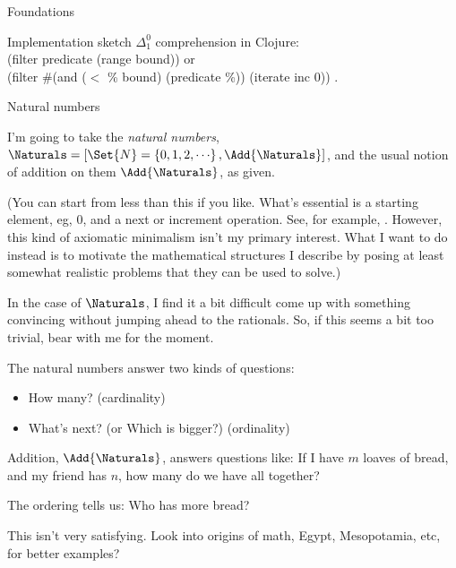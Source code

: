 \documentclass[12pt]{PalisadesLakesBook}
\begin{document}
\begin{plSection}{Foundations}
\begin{plSection}{\texorpdfstring{}{RCA0}}
\begin{plSection}{Implementation sketch}
  $\Delta^0_1$ comprehension in Clojure:\\
    {\clojureFont (filter predicate (range bound))} or\\
      {\clojureFont (filter \#(and ($<$ \% bound) (predicate \%)) (iterate inc 0))}  .

  \end{plSection}%

  \end{plSection}%

\end{plSection}%

\begin{plSection}{Natural numbers}

I'm going to take the \emph{natural numbers},
$\Naturals =
 [ \Set{N}=\left\{ 0, 1, 2, {\cdots}\right\}, \Add{\Naturals}]$,
and the usual notion of addition on them $\Add{\Naturals}$,
as given.

(You can start from less than this if you like.
What's essential is a starting element, eg, $0$,
and a {\pseudocodeFont next}
or {\pseudocodeFont increment} operation. 
See, for example, 
.
However, this kind of axiomatic minimalism 
isn't my primary interest.
What I want to do instead is to motivate the mathematical
structures I describe by posing at least somewhat realistic
problems that they can be used to solve.)

In the case of $\Naturals$, I find it a bit difficult 
come up with something convincing without
jumping ahead to the rationals.
So, if this seems a bit too trivial,
 bear with me for the moment.

The natural numbers answer two kinds of questions:
\begin{itemize}
\item How many?
(cardinality)
\item What's next?
(or Which is bigger?)
(ordinality)
\end{itemize}

Addition, $\Add{\Naturals}$, answers questions like:
If I have $m$ loaves of bread,
and my friend has $n$, how many do we have all together?

The ordering tells us: Who has more bread?

\TODO This isn't very satisfying.
Look into origins of math, Egypt, Mesopotamia, etc, for better
examples?


\end{plSection}
\end{document}
